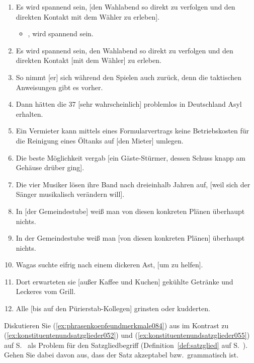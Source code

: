 \begin{enumerate}
  \item Es wird spannend sein, [den Wahlabend so direkt zu verfolgen und den direkten Kontakt mit dem Wähler zu erleben].
    \begin{itemize}
      \item {}, wird spannend sein.
    \end{itemize}
  \item Es wird spannend sein, den Wahlabend so direkt zu verfolgen und den direkten Kontakt [mit dem Wähler] zu erleben.
  \item So nimmt [er] sich während den Spielen auch zurück, denn die taktischen Anweisungen gibt es vorher.
  \item Dann hätten die 37 [sehr wahrscheinlich] problemlos in Deutschland Asyl erhalten.
  \item Ein Vermieter kann mittels eines Formularvertrags keine Betriebskosten für die Reinigung eines Öltanks auf [den Mieter] umlegen.
  \item Die beste Möglichkeit vergab [ein Gäste-Stürmer, dessen Schuss knapp am Gehäuse drüber ging].
  \item Die vier Musiker lösen ihre Band nach dreieinhalb Jahren auf, [weil sich der Sänger musikalisch verändern will].
  \item In [der Gemeindestube] weiß man von diesen konkreten Plänen überhaupt nichts.
  \item In der Gemeindestube weiß man [von diesen konkreten Plänen] überhaupt nichts.
  \item Wagas suchte eifrig nach einem dickeren Ast, [um zu helfen].
  \item Dort erwarteten sie [außer Kaffee und Kuchen] gekühlte Getränke und Leckeres vom Grill.
  \item Alle [bis auf den Pürierstab-Kollegen] grinsten oder kudderten.
\end{enumerate}

 \label{exc:konstituentenstruktur03} Diskutieren Sie (\ref{ex:phrasenkoepfeundmerkmale084}) aus \citet[1--2]{Dekuthy2002} im Kontrast zu (\ref{ex:konstituentenundsatzglieder052}) und (\ref{ex:konstituentenundsatzglieder055}) auf S.~\pageref{ex:konstituentenundsatzglieder052} als Problem für den Satzgliedbegriff (Definition~\ref{def:satzglied} auf S.~\pageref{def:satzglied}).
Gehen Sie dabei davon aus, dass der Satz akzeptabel bzw.\ grammatisch ist.

\begin{exe}
\end{exe}
